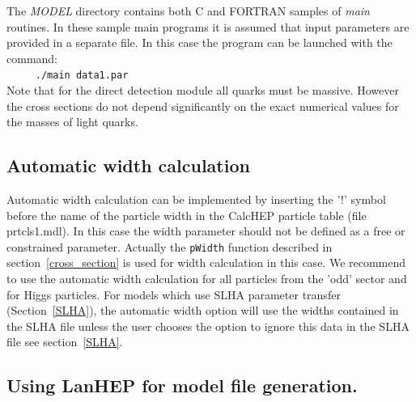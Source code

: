 \documentclass[12pt,a4paper]{article}
\begin{document}
The {\it MODEL} directory contains both  C and FORTRAN samples of {\it main}
routines. In these sample main programs it is assumed that input parameters are provided in a separate
file. In this case the  program can be launched with the command:\\
\verb|     ./main data1.par|\\
Note that for the direct detection module all quarks must be  massive. 
However the cross sections do not depend significantly on the exact  
numerical values for the masses of light quarks.

 
\subsection{Automatic width calculation}
Automatic width calculation can be 
implemented by  inserting the '!' symbol before the name of the particle width  in 
the CalcHEP particle table (file prtcls1.mdl). In this case the width parameter 
should not be defined as a free or constrained parameter. 
Actually the \verb|pWidth| function  described in section~\ref{cross_section} is  used for width calculation in this case.
We recommend to use the
automatic width calculation for all particles from the 'odd' sector and for
Higgs particles. 
For models which use SLHA parameter transfer (Section~\ref{SLHA}), 
the automatic width option will use the widths contained in the SLHA file unless the user chooses the option to
ignore this data in the SLHA file see section~\ref{SLHA}. 


\subsection{Using LanHEP for model file generation.}
\end{document}
